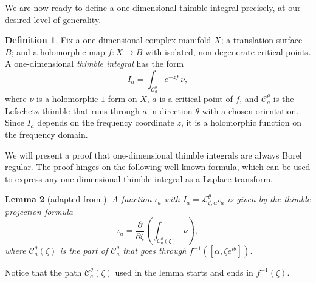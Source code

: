 \documentclass{article}
\newcommand{\maps}{\colon}
\newcommand{\laplace}{\mathcal{L}}
\theoremstyle{definition}
\newtheorem{definition}{Definition}[section]
\theoremstyle{plain}
\newtheorem{lemma}[definition]{Lemma}
\begin{document}
We are now ready to define a one-dimensional thimble integral precisely, at our desired level of generality.
\begin{definition}
Fix a one-dimensional complex manifold $X$; a translation surface $B$; and a holomorphic map $f \maps X \to B$ with isolated, non-degenerate critical points. A one-dimensional {\em thimble integral} has the form
\[ I_a = \int_{\mathcal{C}_a^\theta} e^{-zf}\,\nu, \]
where $\nu$ is a holomorphic $1$-form on $X$, $a$ is a critical point of $f$, and $\mathcal{C}^\theta_a$ is the Lefschetz thimble that runs through $a$ in direction $\theta$ with a chosen orientation. Since $I_a$ depends on the frequency coordinate $z$, it is a holomorphic function on the frequency domain.
\end{definition}
We will present a proof that one-dimensional thimble integrals are always Borel regular. The proof hinges on the following well-known formula, which can be used to express any one-dimensional thimble integral as a Laplace transform.
\begin{lemma}[adapted from {\cite[Section~3.3]{pham}}]\label{lem:thimble_proj_formula}
A function $\iota_a$ with $I_a = \laplace_{\zeta, \alpha}^\theta \iota_a$ is given by the {\em thimble projection formula}
\begin{equation}\label{eqn:formula}
    \iota_a = \frac{\partial}{\partial \zeta} \left( \int_{\mathcal{C}_a^\theta(\zeta)}\nu \right),
\end{equation}
where $\mathcal{C}_a^\theta(\zeta)$ is the part of $\mathcal{C}_a^\theta$ that goes through $f^{-1}([\alpha,\zeta e^{i\theta}])$.
\end{lemma}
Notice that the path $\mathcal{C}_a^\theta(\zeta)$ used in the lemma starts and ends in $f^{-1}(\zeta)$.
\end{document}
